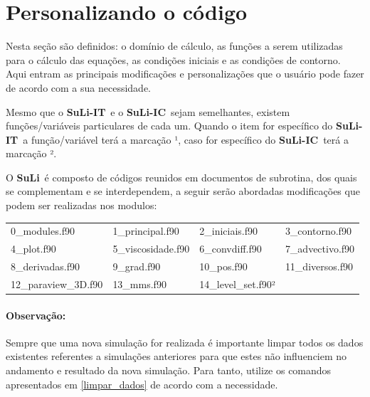 \documentclass[12pt, a4paper]{article}
\newcommand{\SL}{{\bf SuLi}}
\newcommand{\SLIT}{{\bf SuLi-IT}}
\newcommand{\SLIC}{{\bf SuLi-IC}}
\begin{document}

\newpage

\section{Personalizando o código}	\label{utilizando_o_codigo}

Nesta seção são definidos: o domínio de cálculo, as funções a serem utilizadas para o cálculo das equações, as condições iniciais e as condições de contorno. Aqui entram as principais modificações e personalizações que o usuário pode fazer de acordo com a sua necessidade.

Mesmo que o \SLIT\ e o \SLIC\ sejam semelhantes, existem funções/variáveis particulares de cada um. Quando o item for específico do \SLIT\ a função/variável terá a marcação ¹, caso for específico do \SLIC\ terá a marcação ².

O \SL\ é composto de códigos reunidos em documentos de subrotina, dos quais se complementam e se interdependem, a seguir serão abordadas modificações que podem ser realizadas nos modulos:

\begin{table}[htb]
	\begin{center}
		\begin{tabular}{llll}
		0\_modules.f90 & 1\_principal.f90 & 2\_iniciais.f90 & 3\_contorno.f90 \\
		4\_plot.f90  & 5\_viscosidade.f90 & 6\_convdiff.f90 & 7\_advectivo.f90 \\
		8\_derivadas.f90 & 9\_grad.f90 & 10\_pos.f90 & 11\_diversos.f90 \\
		12\_paraview\_3D.f90 & 13\_mms.f90 & 14\_level\_set.f90² & \\
		\end{tabular}		
	\end{center}
\end{table}

\paragraph{Observação:} Sempre que uma nova simulação for realizada é importante limpar todos os dados existentes referentes a simulações anteriores para que estes não influenciem no andamento e resultado da nova simulação. Para tanto, utilize os comandos apresentados em \ref{limpar_dados} de acordo com a necessidade.
\end{document}
